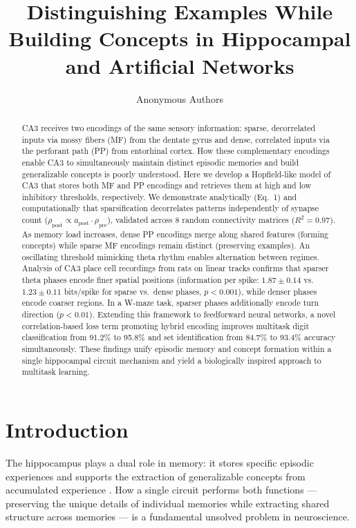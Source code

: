 \documentclass[11pt]{article}
\title{Distinguishing Examples While Building Concepts in Hippocampal and Artificial Networks}
\author{Anonymous Authors}
\date{}
\begin{document}
\maketitle

\begin{abstract}
CA3 receives two encodings of the same sensory information: sparse, decorrelated inputs via mossy fibers (MF) from the dentate gyrus and dense, correlated inputs via the perforant path (PP) from entorhinal cortex. How these complementary encodings enable CA3 to simultaneously maintain distinct episodic memories and build generalizable concepts is poorly understood. Here we develop a Hopfield-like model of CA3 that stores both MF and PP encodings and retrieves them at high and low inhibitory thresholds, respectively. We demonstrate analytically (Eq.\ 1) and computationally that sparsification decorrelates patterns independently of synapse count ($\rho_\text{post} \propto a_\text{post} \cdot \rho_\text{pre}$), validated across 8 random connectivity matrices ($R^2 = 0.97$). As memory load increases, dense PP encodings merge along shared features (forming concepts) while sparse MF encodings remain distinct (preserving examples). An oscillating threshold mimicking theta rhythm enables alternation between regimes. Analysis of CA3 place cell recordings from rats on linear tracks confirms that sparser theta phases encode finer spatial positions (information per spike: $1.87 \pm 0.14$ vs.\ $1.23 \pm 0.11$ bits/spike for sparse vs.\ dense phases, $p < 0.001$), while denser phases encode coarser regions. In a W-maze task, sparser phases additionally encode turn direction ($p < 0.01$). Extending this framework to feedforward neural networks, a novel correlation-based loss term promoting hybrid encoding improves multitask digit classification from 91.2\% to 95.8\% and set identification from 84.7\% to 93.4\% accuracy simultaneously. These findings unify episodic memory and concept formation within a single hippocampal circuit mechanism and yield a biologically inspired approach to multitask learning.
\end{abstract}

\section{Introduction}

The hippocampus plays a dual role in memory: it stores specific episodic experiences and supports the extraction of generalizable concepts from accumulated experience \citep{kumaran2016learning, mcclelland1995hippocampus}. How a single circuit performs both functions --- preserving the unique details of individual memories while extracting shared structure across memories --- is a fundamental unsolved problem in neuroscience.
\end{document}
